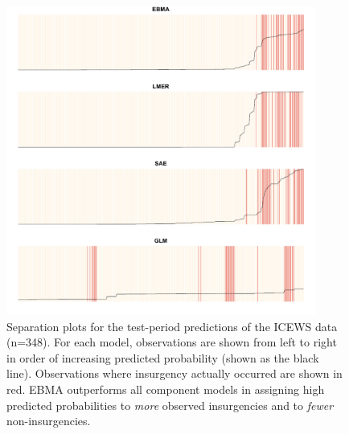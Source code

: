 \begin{figure}
 \caption{\footnotesize Separation plots for the test-period
    predictions of the ICEWS data (n=348).  For each model,
    observations are shown from left to right in order of increasing
    predicted probability (shown as the black line).  Observations
    where insurgency actually occurred are shown in red.  EBMA
    outperforms all component models in assigning high predicted
    probabilities to \textit{more} observed insurgencies and to
    \textit{fewer} non-insurgencies.}
\label{OutSam1sep}
\begin{center}
\includegraphics[width=4in]{OutSample2-1.pdf}
\end{center}
\end{figure}


